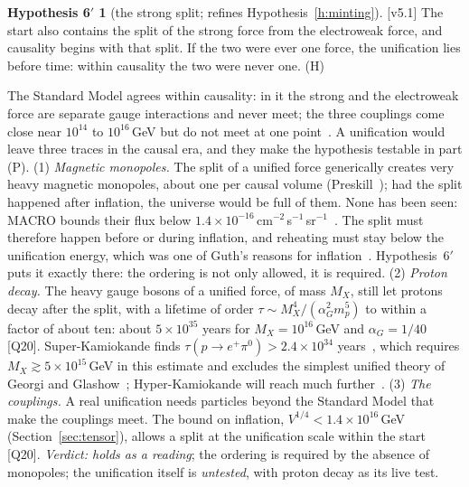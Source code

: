 \documentclass[11pt,a4paper]{article}
\theoremstyle{definition}
\theoremstyle{remark}
\newcommand{\chk}[1]{\textsf{[#1]}}
\newcommand{\tagH}{\textsf{(H)}}
\newcommand{\tagP}{\textsf{(P)}}
\newcommand{\vtag}{{\color{newc}\textsf{\scriptsize[v5.1]}}}
\newenvironment{vnew}{\color{newc}}{}
\theoremstyle{definition}
\newtheorem*{hypothesisprime6}{Hypothesis 6$'$}
\begin{document}
\begin{vnew}
\begin{hypothesisprime6}[the strong split; refines Hypothesis~\ref{h:minting}]
\vtag{} The start also contains the split of the strong force from the electroweak force, and causality begins with that split. If the two
were ever one force, the unification lies before time: within causality the two were never one. \tagH
\end{hypothesisprime6}

\noindent\vtag{} The Standard Model agrees within causality: in it the strong and the electroweak force are separate gauge interactions
and never meet; the three couplings come close near $10^{14}$ to $10^{16}$\,GeV but do not meet at one point~\cite{amaldi}. A unification
would leave three traces in the causal era, and they make the hypothesis testable in part \tagP. (1) \emph{Magnetic monopoles.} The split of
a unified force generically creates very heavy magnetic monopoles, about one per causal volume (Preskill~\cite{preskill}); had the split
happened after inflation, the universe would be full of them. None has been seen: MACRO bounds their flux below
$1.4\times10^{-16}$\,cm$^{-2}$\,s$^{-1}$\,sr$^{-1}$~\cite{macro}. The split must therefore happen before or during inflation, and reheating
must stay below the unification energy, which was one of Guth's reasons for inflation~\cite{guth}. Hypothesis~6$'$ puts it exactly there:
the ordering is not only allowed, it is required. (2) \emph{Proton decay.} The heavy gauge bosons of a unified force, of mass $M_X$, still
let protons decay after the split, with a lifetime of order $\tau\sim M_X^4/(\alpha_G^2m_p^5)$ to within a factor of about ten: about
$5\times10^{35}$ years for $M_X=10^{16}$\,GeV and $\alpha_G=1/40$ \chk{Q20}. Super-Kamiokande finds $\tau(p\to e^+\pi^0)>2.4\times10^{34}$
years~\cite{superk}, which requires $M_X\gtrsim5\times10^{15}$\,GeV in this estimate and excludes the simplest unified theory of Georgi and
Glashow~\cite{georgiglashow}; Hyper-Kamiokande will reach much further~\cite{hyperk}. (3) \emph{The couplings.} A real unification needs
particles beyond the Standard Model that make the couplings meet. The bound on inflation, $V^{1/4}<1.4\times10^{16}$\,GeV
(Section~\ref{sec:tensor}), allows a split at the unification scale within the start \chk{Q20}. \emph{Verdict: holds as a reading}; the
ordering is required by the absence of monopoles; the unification itself is \emph{untested}, with proton decay as its live test.


\end{vnew}
\end{document}
